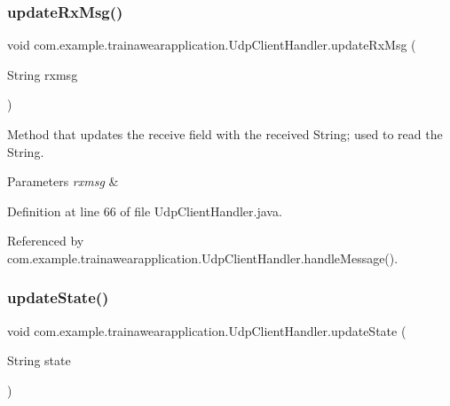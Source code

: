 \subsubsection{\texorpdfstring{updateRxMsg()}{updateRxMsg()}}
{\footnotesize\ttfamily void com.\+example.\+trainawearapplication.\+Udp\+Client\+Handler.\+update\+Rx\+Msg (\begin{DoxyParamCaption}\item[{String}]{rxmsg }\end{DoxyParamCaption})\hspace{0.3cm}{\ttfamily [private]}}



Method that updates the receive field with the received String; used to read the String. 


\begin{DoxyParams}{Parameters}
{\em rxmsg} & \\
\hline
\end{DoxyParams}


Definition at line 66 of file Udp\+Client\+Handler.\+java.


\begin{DoxyCode}{0}

\end{DoxyCode}


Referenced by com.\+example.\+trainawearapplication.\+Udp\+Client\+Handler.\+handle\+Message().

\mbox{\label{classcom_1_1example_1_1trainawearapplication_1_1_udp_client_handler_a65fd50027c6302d5c8d858e844fc3e6f}} 
\subsubsection{\texorpdfstring{updateState()}{updateState()}}
{\footnotesize\ttfamily void com.\+example.\+trainawearapplication.\+Udp\+Client\+Handler.\+update\+State (\begin{DoxyParamCaption}\item[{String}]{state }\end{DoxyParamCaption})\hspace{0.3cm}{\ttfamily [private]}}



